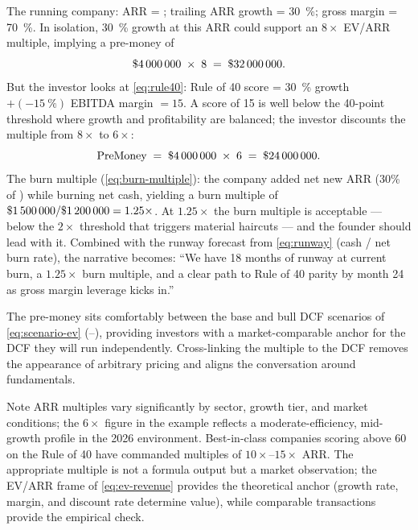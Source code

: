 \begin{example}
The running company: ARR = ; trailing ARR growth = \qty{30}{\percent};
gross margin = \qty{70}{\percent}. In isolation, \qty{30}{\percent} growth at this ARR
could support an \(8\times\) EV/ARR multiple, implying a pre-money of
\[
  \$\num{4000000} \;\times\; 8 \;=\; \$\num{32000000}.
\]
But the investor looks at \cref{eq:rule40}: Rule of 40 score = \qty{30}{\percent} growth
$+ (-\qty{15}{\percent})$ EBITDA margin $= 15$. A score of 15 is well below the 40-point
threshold where growth and profitability are balanced; the investor discounts the multiple
from $8\times$ to $6\times$:
\[
  \mathrm{PreMoney} \;=\; \$\num{4000000} \;\times\; 6 \;=\; \$\num{24000000}.
\]
The burn multiple (\cref{eq:burn-multiple}): the company added  net new ARR
(30\% of ) while burning  net cash, yielding a burn multiple
of \(\$\num{1500000}/\$\num{1200000} = 1.25\times\). At $1.25\times$ the burn multiple is
acceptable --- below the $2\times$ threshold that triggers material haircuts --- and the
founder should lead with it. Combined with the runway forecast from \cref{eq:runway} (cash
/ net burn rate), the narrative becomes: ``We have 18 months of runway at current burn, a
$1.25\times$ burn multiple, and a clear path to Rule of 40 parity by month 24 as gross
margin leverage kicks in.''

The  pre-money sits comfortably between the base and bull DCF scenarios of
\cref{eq:scenario-ev} (--), providing investors with a
market-comparable anchor for the DCF they will run independently. Cross-linking the
multiple to the DCF removes the appearance of arbitrary pricing and aligns the conversation
around fundamentals.
\end{example}

\begin{admonition}{Note}
ARR multiples vary significantly by sector, growth tier, and market conditions; the
\(6\times\) figure in the example reflects a moderate-efficiency, mid-growth profile in the
2026 environment. Best-in-class companies scoring above 60 on the Rule of 40 have commanded
multiples of \(10\times\)--\(15\times\) ARR. The appropriate multiple is not a formula
output but a market observation; the EV/ARR frame of \cref{eq:ev-revenue} provides the
theoretical anchor (growth rate, margin, and discount rate determine value), while comparable
transactions provide the empirical check.
\end{admonition}

